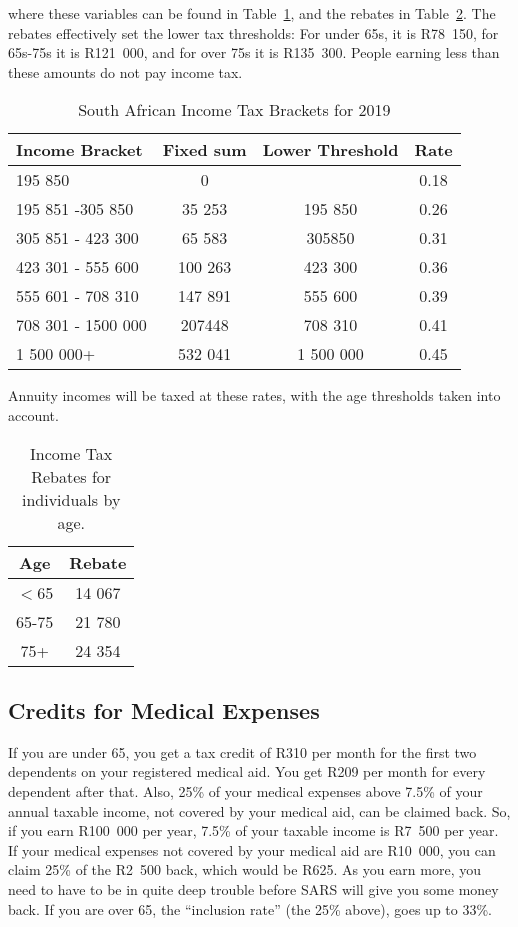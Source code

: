 \documentclass[a4paper, justified]{tufte-handout}
\begin{document}
where these variables can be found in Table~\ref{tab:IncomeTax}, and the rebates in Table~\ref{tab:rebates}. The rebates effectively set the lower tax thresholds: For under 65s, it is R78~150, for 65s-75s it is R121~000, and for over 75s it is R135~300. People earning less than these amounts do not pay income tax.
\begin{table}[b]
	\centering
	\caption{South African Income Tax Brackets for 2019}
	\label{tab:IncomeTax}
	\begin{tabular}{lccc}
		\toprule
		\textbf{Income Bracket}  & \textbf{Fixed sum} & \textbf{Lower Threshold} & \textbf{Rate} \\
		\midrule
		195 850            & 0         &          & 0.18 \\
		195 851 -305 850  & 35 253    & 195 850         & 0.26 \\
		305 851 - 423 300  & 65 583    & 305850          & 0.31  \\
		423 301 - 555 600  & 100 263   & 423 300         & 0.36  \\
		555 601 - 708 310    & 147 891   & 555 600         & 0.39  \\
		708 301 - 1500 000 & 207448    & 708 310         & 0.41 \\
		1 500 000+         & 532 041   & 1 500 000       & 0.45\\
	\bottomrule
	\end{tabular}
\end{table}

Annuity incomes will be taxed at these rates, with the age thresholds taken into account.

\begin{table}[]
	\centering
	\caption{Income Tax Rebates for individuals by age.}
	\label{tab:rebates}
	\begin{tabular}{cc}
		\toprule
		\textbf{Age}           & \textbf{Rebate} \\
		\midrule
		$<$65 & 14 067 \\
		65-75         & 21 780 \\
		75+           & 24 354\\
		\bottomrule
	\end{tabular}
\end{table}

\subsection{Credits for Medical Expenses}
If you are under 65, you get a tax credit of R310 per month for the first two dependents on your registered medical aid. You get R209 per month for every dependent after that. Also, 25\% of your medical expenses above 7.5\% of your annual taxable income, not covered by your medical aid, can be claimed back. So, if you earn R100~000 per year, 7.5\% of your taxable income is R7~500 per year. If your  medical expenses not covered by your medical aid are R10~000, you can claim 25\% of the R2~500 back, which would be R625. As you earn more, you need to have to be in quite deep trouble before SARS will give you some money back.
If you are over 65, the ``inclusion rate'' (the 25\% above), goes up to 33\%.
\end{document}
